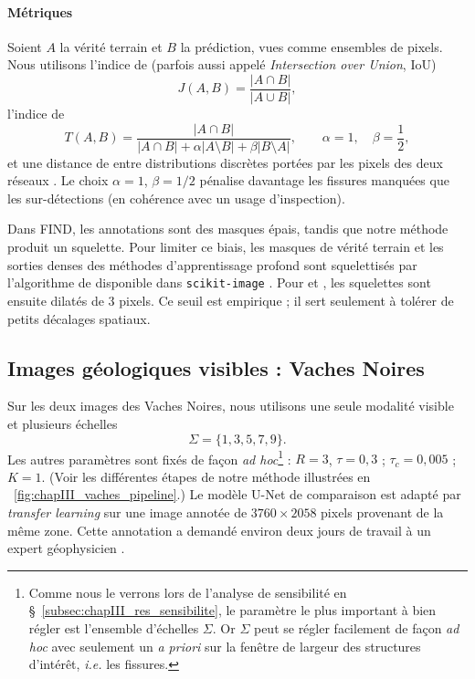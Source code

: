 \paragraph{Métriques}
Soient $A$ la vérité terrain et $B$ la prédiction, vues comme ensembles de pixels. Nous utilisons l'indice de  \cite{Jaccard1901} (parfois aussi appelé \emph{Intersection over Union}, IoU)
\begin{equation}
    J(A,B)=\frac{|A\cap B|}{|A\cup B|},
\end{equation}
l'indice de  \cite{Tversky1977}
\begin{equation}
    T(A,B)
    =
    \frac{|A\cap B|}{|A\cap B|+\alpha|A\setminus B|+\beta|B\setminus A|},
    \qquad
    \alpha=1,\quad \beta=\frac12,
\end{equation}
et une distance de  entre distributions discrètes portées par les pixels des deux réseaux \cite{Wasserstein}. Le choix $\alpha=1$, $\beta=1/2$ pénalise davantage les fissures manquées que les sur-détections (en cohérence avec un usage d'inspection).

Dans FIND, les annotations sont des masques épais, tandis que notre méthode produit un squelette. Pour limiter ce biais, les masques de vérité terrain et les sorties denses des méthodes d'apprentissage profond sont squelettisés par l'algorithme de  disponible dans \texttt{scikit-image} \cite{SciKitSkeletonization}. Pour  et , les squelettes sont ensuite dilatés de $3$ pixels. Ce seuil est empirique ; il sert seulement à tolérer de petits décalages spatiaux.

\subsection{Images géologiques visibles : Vaches Noires}
\label{subsec:chapIII_res_vaches}

Sur les deux images des Vaches Noires, nous utilisons une seule modalité visible et plusieurs échelles
\[
    \Sigma=\{1,3,5,7,9\}.
\]
Les autres paramètres sont fixés de façon \emph{ad hoc}\footnote{Comme nous le verrons lors de l'analyse de sensibilité en \S~\ref{subsec:chapIII_res_sensibilite}, le paramètre le plus important à bien régler est l'ensemble d'échelles $\Sigma$. Or $\Sigma$ peut se régler facilement de façon \emph{ad hoc} avec seulement un \emph{a priori} sur la fenêtre de largeur des structures d'intérêt, \emph{i.e.} les fissures.} : $R=3$, $\tau=0,3$ ; $\tau_c=0,005$ ; $K=1$. 
(Voir les différentes étapes de notre méthode illustrées en \Fig~\ref{fig:chapIII_vaches_pipeline}.)
Le modèle U-Net de comparaison est adapté par \emph{transfer learning} sur une image annotée de $3760\times2058$ pixels provenant de la même zone. Cette annotation a demandé environ deux jours de travail à un expert géophysicien \cite{BibiStrasbourg}.

